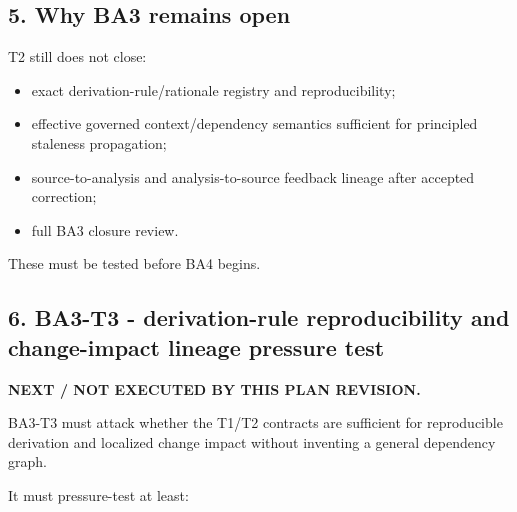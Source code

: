 \documentclass[11pt,a4paper]{article}
\providecommand{\tightlist}{\setlength{\itemsep}{0pt}\setlength{\parskip}{0pt}}\setlength{\emergencystretch}{4em}\hbadness=10000\hfuzz=20pt\sloppy
\begin{document}
\subsection{5. Why BA3 remains open}\label{why-ba3-remains-open}

T2 still does not close:

\begin{itemize}
\tightlist
\item
  exact derivation-rule/rationale registry and reproducibility;
\item
  effective governed context/dependency semantics sufficient for
  principled staleness propagation;
\item
  source-to-analysis and analysis-to-source feedback lineage after
  accepted correction;
\item
  full BA3 closure review.
\end{itemize}

These must be tested before BA4 begins.

\subsection{6. BA3-T3 - derivation-rule reproducibility and
change-impact lineage pressure
test}\label{ba3-t3---derivation-rule-reproducibility-and-change-impact-lineage-pressure-test}

\textbf{NEXT / NOT EXECUTED BY THIS PLAN REVISION.}

BA3-T3 must attack whether the T1/T2 contracts are sufficient for
reproducible derivation and localized change impact without inventing a
general dependency graph.

It must pressure-test at least:
\end{document}
